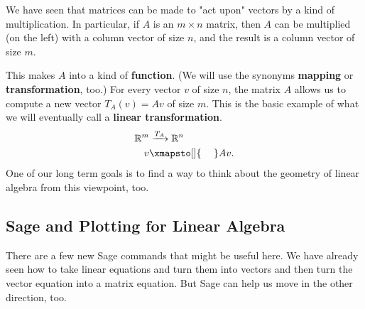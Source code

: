 \documentclass[10pt,]{book}
\newcommand{\terminology}[1]{\textbf{#1}}
\theoremstyle{plain}
\numberwithin{equation}{section}
\begin{document}
        We have seen that matrices can be made to "act upon" vectors by a kind of
        multiplication. In particular, if \(A\) is an \(m\times n\) matrix,
        then \(A\) can be multiplied (on the left) with a column vector of size
        \(n\), and the result is a column vector of size \(m\).
\par

        This makes \(A\) into a kind of \terminology{function}. (We will use
        the synonyms \terminology{mapping} or \terminology{transformation}, too.)
        For every vector \(v\) of size \(n\), the matrix \(A\) allows
        us to compute a new vector \(T_A(v) = Av\) of size \(m\). This is
        the basic example of what we will eventually call a \terminology{linear
        transformation}.\begin{align*}
\mathbb{R}^m & \xrightarrow[]{T_A} \mathbb{R}^n\\
v & \xmapsto[]{\phantom{T_A}} Av.
\end{align*}
        One of our long term goals is to find a way to think about the geometry
        of linear algebra from this viewpoint, too.
\typeout{************************************************}
\typeout{************************************************}
\subsection[Sage and Plotting for Linear Algebra]{Sage and Plotting for Linear Algebra}\label{subsection-22}
There are a few new Sage commands that might be useful here. We have
      already seen how to take linear equations and turn them into vectors
      and then turn the vector equation into a matrix equation. But Sage can
      help us move in the other direction, too.
\par
\end{document}
